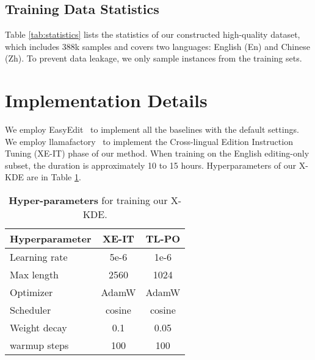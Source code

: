 \subsection{Training Data Statistics}
\label{sec:appendix_data_construction}
Table \ref{tab:statistics} lists the statistics of our constructed high-quality dataset, which includes 388k samples and covers two languages: English (En) and Chinese (Zh). To prevent data leakage, we only sample instances from the training sets.

\section{Implementation Details}
\label{sec:appendix_implementation}
We employ EasyEdit~\cite{wang2023easyedit} to implement all the baselines with the default settings. We employ llamafactory~\cite{zheng2024llamafactory} to implement the Cross-lingual Edition Instruction Tuning (XE-IT) phase of our method. When training on the English editing-only subset, the duration is approximately 10 to 15 hours. Hyperparameters of our X-KDE are in Table \ref{tab:hyperparameters}.


\begin{table}[!h]
\small
\centering
{\begin{tabular}{lcc}
\toprule
\textbf{Hyperparameter} & \textbf{XE-IT} & \textbf{TL-PO} \\ 
\midrule
Learning rate           & 5e-6             & 1e-6              \\
Max length              & 2560             & 1024              \\
Optimizer               & AdamW            & AdamW             \\
Scheduler               & cosine           & cosine            \\
Weight decay            & 0.1              & 0.05                \\
warmup steps            & 100              & 100   
\\ \bottomrule
\end{tabular}}
\caption{\label{tab:hyperparameters}
\textbf{Hyper-parameters} for training our X-KDE.}
\end{table}

